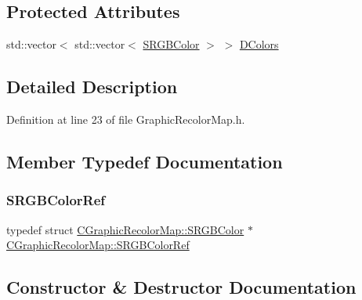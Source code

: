 \subsection*{Protected Attributes}
\begin{DoxyCompactItemize}
\item 
std\+::vector$<$ std\+::vector$<$ \hyperlink{structCGraphicRecolorMap_1_1SRGBColor}{S\+R\+G\+B\+Color} $>$ $>$ \hyperlink{classCGraphicRecolorMap_a9dea9a9e96e4465a53a40c4a34cebf71}{D\+Colors}
\end{DoxyCompactItemize}


\subsection{Detailed Description}


Definition at line 23 of file Graphic\+Recolor\+Map.\+h.



\subsection{Member Typedef Documentation}
\hypertarget{classCGraphicRecolorMap_a0d6a510563b75b7dfe5f97db2cdeb2c2}{}\label{classCGraphicRecolorMap_a0d6a510563b75b7dfe5f97db2cdeb2c2} 
\subsubsection{\texorpdfstring{S\+R\+G\+B\+Color\+Ref}{SRGBColorRef}}
{\footnotesize\ttfamily typedef  struct \hyperlink{structCGraphicRecolorMap_1_1SRGBColor}{C\+Graphic\+Recolor\+Map\+::\+S\+R\+G\+B\+Color} $\ast$ \hyperlink{classCGraphicRecolorMap_a0d6a510563b75b7dfe5f97db2cdeb2c2}{C\+Graphic\+Recolor\+Map\+::\+S\+R\+G\+B\+Color\+Ref}\hspace{0.3cm}{\ttfamily [protected]}}



\subsection{Constructor \& Destructor Documentation}
\hypertarget{classCGraphicRecolorMap_a448553601e8405dc915e4e6b4f56b8c7}{}\label{classCGraphicRecolorMap_a448553601e8405dc915e4e6b4f56b8c7} 
